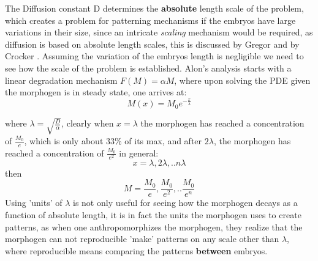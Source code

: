 The Diffusion constant D determines the \textbf{absolute} length scale of the problem, which creates a problem for patterning mechanisms if the embryos have large variations in their size, since an intricate \textit{scaling} mechanism would be required, as diffusion is based on absolute length scales, this is discussed by Gregor and by Crocker \cite{pmid18328473}.  Assuming the variation of the embryos length is negligible we need to see how the scale of the problem is established. Alon's analysis starts with a linear degradation mechanism $F(M) =\alpha M $, where upon solving the PDE given the morphogen is in steady state, one arrives at:
\begin{equation}\label{ss}
    M(x) = M_0 e^{-\frac{x}{\lambda}}
\end{equation}

where $\lambda = \sqrt{\frac{D}{\alpha}}$, clearly when $x=\lambda$ the morphogen has reached a concentration of $\frac{M_0}{e}$, which is only about 33\% of its max, and after $2 \lambda$, the morphogen has reached a concentration of $\frac{M_0}{e^2}$ in general:
\begin{equation}\label{}
    x = \lambda, 2\lambda, .. n \lambda
\end{equation}
then
\begin{equation}\label{morpscale}
    M = \frac{M_0}{e},\frac{M_0}{e^2},..\frac{M_0}{e^n}
\end{equation}
 Using 'units' of $\lambda$ is not only useful for seeing how the morphogen decays as a function of absolute length, it is in fact the units the morphogen uses to create patterns, as when one anthropomorphizes the morphogen, they realize that the morphogen can not reproducible 'make' patterns on any scale other than $ \lambda $, where reproducible means comparing the patterns \textbf{between} embryos.


